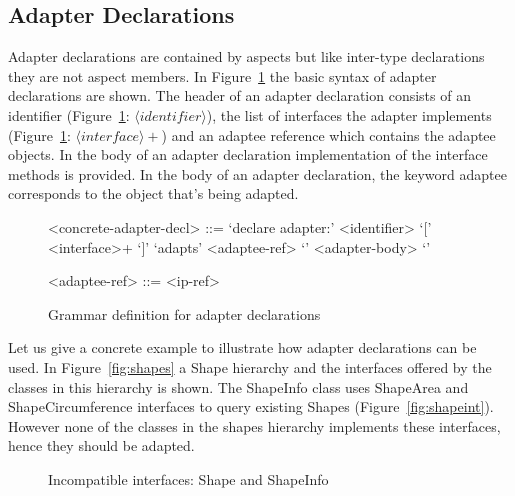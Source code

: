 \documentclass{acm_proc_article-sp}
\begin{document}
\subsection{Adapter Declarations}
\label{adintro}

Adapter declarations are contained by aspects but like inter-type declarations they are not aspect members. In Figure~\ref{basicgram} the basic syntax of adapter declarations are shown. 
The header of an adapter declaration consists of an identifier (Figure~\ref{basicgram}: $\langle identifier \rangle$), the list of interfaces the adapter implements (Figure~\ref{basicgram}: $\langle interface \rangle+$) and an adaptee reference which contains the adaptee objects. In the body of an adapter declaration implementation of the interface methods is provided. In the body of an adapter declaration, the keyword \textsf{adaptee} corresponds to the object that's being adapted. 

\begin{figure}[h!]
\begin{grammar}
<concrete-adapter-decl> ::= `declare adapter:' <identifier> `[' <interface>+ `]' `adapts' <adaptee-ref> `{'
<adapter-body> `}'

<adaptee-ref> ::= <ip-ref> 
\end{grammar}
\caption{Grammar definition for adapter declarations}
\label{basicgram}
\end{figure}

Let us give a concrete example to illustrate how adapter declarations can be used. In Figure~\ref{fig:shapes} a \textsf{Shape} hierarchy and the interfaces offered by the classes in this hierarchy is shown. The \textsf{ShapeInfo} class uses \textsf{ShapeArea} and \textsf{ShapeCircumference} interfaces to query existing \textsf{Shape}s (Figure~\ref{fig:shapeint}). However none of the classes in the shapes hierarchy implements these interfaces, hence they should be adapted. 


\begin{figure}[ht]
\hspace{10pt}
\caption{Incompatible interfaces: Shape and ShapeInfo}
\label{fig:shapeinfo}
\end{figure}
\end{document}
